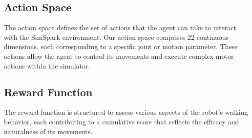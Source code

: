 \documentclass[conference]{IEEEtran}
\begin{document}
\subsection{Action Space}\label{Action Space}

The action space defines the set of actions that the agent can take to interact with the SimSpark environment. Our action space comprises 22 continuous
dimensions, each corresponding to a specific joint or motion parameter. These actions allow the agent to control its movements and execute complex motor actions within the simulator.

\subsection{Reward Function}\label{Reward Function}

The reward function is structured to assess various aspects of the robot's walking behavior, each contributing to a cumulative score that reflects the efficacy and naturalness of its movements.
\end{document}
